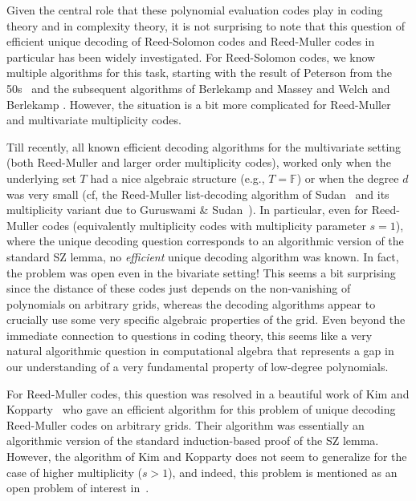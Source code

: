 \documentclass{theoretics}
\def\Field{\mathbb{F}}
\let\F\Field
\begin{document}
	Given the central role that these polynomial evaluation codes play in
	coding theory and in complexity theory, it is not surprising to note
	that this question of efficient unique decoding of Reed-Solomon codes
	and Reed-Muller codes in particular has been widely investigated. For
	Reed-Solomon codes, we know multiple algorithms for this task,
	starting with the result of Peterson from the 50s~\cite{Peterson1960}
	and the subsequent algorithms of Berlekamp and Massey
	\cite{Berlekamp,Massey1969} and Welch and Berlekamp
	\cite{WelchB1986}. However, the situation is a bit more complicated
	for Reed-Muller and multivariate multiplicity codes.
	
	Till recently, all known efficient decoding algorithms for the multivariate setting (both Reed-Muller and larger order multiplicity codes),  worked only when
	the underlying set $T$ had a nice algebraic structure (e.g., $T = \F$)
	or when the degree $d$ was very small (cf, the Reed-Muller
	list-decoding algorithm of Sudan~\cite{Sudan1997} and its multiplicity
	variant due to Guruswami \& Sudan~\cite{GuruswamiS1999}). In particular, even for Reed-Muller codes (equivalently multiplicity codes with multiplicity parameter $s=1$), where the unique decoding question corresponds to an algorithmic version of the standard SZ lemma, no \emph{efficient} unique decoding algorithm was known. In fact, the problem was open even in the bivariate setting! This seems a bit surprising since the distance of these codes just depends on the non-vanishing of polynomials on arbitrary grids, whereas the decoding algorithms appear to crucially use some very specific algebraic properties of the grid. Even beyond the immediate connection to questions in coding theory, this seems like a very natural algorithmic question in computational algebra that represents a gap in our understanding of a very fundamental property of low-degree polynomials.  
	
	For Reed-Muller codes, this question was resolved in a beautiful work of Kim and Kopparty~\cite{KimK2017} who gave an efficient algorithm for this problem of unique decoding Reed-Muller codes on arbitrary grids. Their algorithm was essentially an algorithmic version of the standard induction-based proof of the SZ lemma. However, the algorithm of Kim and Kopparty does not seem to generalize for the case of higher multiplicity ($s > 1$), and indeed, this problem is mentioned as an open problem of interest in~\cite{KimK2017}. 
	
\end{document}

